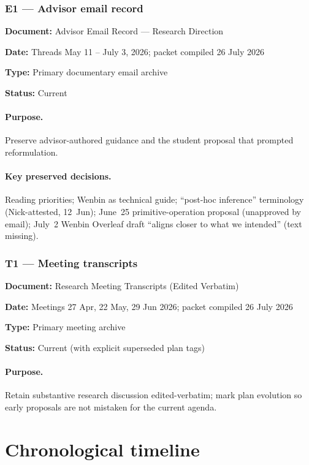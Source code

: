 \documentclass[11pt]{article}
\newcommand{\Status}[1]{\textbf{Status:} #1}
\newcommand{\Meta}[2]{\par\noindent\textbf{#1:} #2\par}
\begin{document}
\subsubsection*{E1 --- Advisor email record}
\Meta{Document}{Advisor Email Record --- Research Direction}
\Meta{Date}{Threads May 11 -- July 3, 2026; packet compiled 26 July 2026}
\Meta{Type}{Primary documentary email archive}
\Status{Current}

\paragraph{Purpose.}
Preserve advisor-authored guidance and the student proposal that prompted reformulation.

\paragraph{Key preserved decisions.}
Reading priorities; Wenbin as technical guide; ``post-hoc inference'' terminology
(Nick-attested, 12~Jun); June~25 primitive-operation proposal (unapproved by email);
July~2 Wenbin Overleaf draft ``aligns closer to what we intended'' (text missing).

\subsubsection*{T1 --- Meeting transcripts}
\Meta{Document}{Research Meeting Transcripts (Edited Verbatim)}
\Meta{Date}{Meetings 27 Apr, 22 May, 29 Jun 2026; packet compiled 26 July 2026}
\Meta{Type}{Primary meeting archive}
\Status{Current (with explicit superseded plan tags)}

\paragraph{Purpose.}
Retain substantive research discussion edited-verbatim; mark plan evolution so early proposals
are not mistaken for the current agenda.

\section{Chronological timeline}
\end{document}
